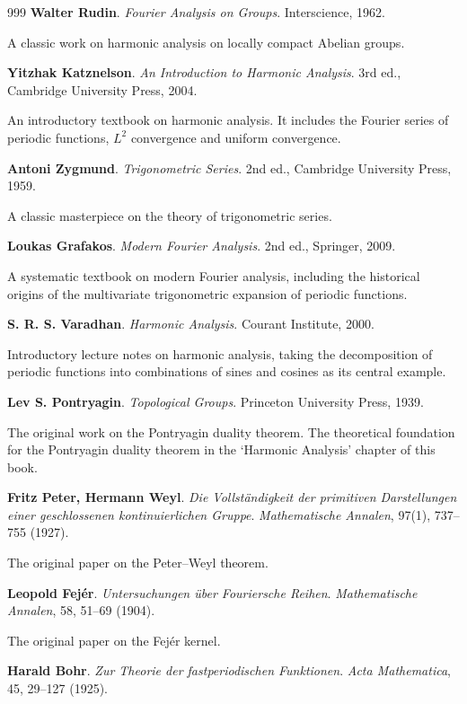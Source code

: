 \begin{thebibliography}{999}
 \textbf{Walter Rudin}. \textit{Fourier Analysis on Groups}. Interscience, 1962.

A classic work on harmonic analysis on locally compact Abelian groups.

 \textbf{Yitzhak Katznelson}. \textit{An Introduction to Harmonic Analysis}. 3rd ed., Cambridge University Press, 2004.

An introductory textbook on harmonic analysis. It includes the Fourier series of periodic functions, $L^2$ convergence and uniform convergence.

 \textbf{Antoni Zygmund}. \textit{Trigonometric Series}. 2nd ed., Cambridge University Press, 1959.

A classic masterpiece on the theory of trigonometric series.

 \textbf{Loukas Grafakos}. \textit{Modern Fourier Analysis}. 2nd ed., Springer, 2009.

A systematic textbook on modern Fourier analysis, including the historical origins of the multivariate trigonometric expansion of periodic functions.

 \textbf{S. R. S. Varadhan}. \textit{Harmonic Analysis}. Courant Institute, 2000.

Introductory lecture notes on harmonic analysis, taking the decomposition of periodic functions into combinations of sines and cosines as its central example.

 \textbf{Lev S. Pontryagin}. \textit{Topological Groups}. Princeton University Press, 1939.

The original work on the Pontryagin duality theorem. The theoretical foundation for the Pontryagin duality theorem in the `Harmonic Analysis' chapter of this book.

 \textbf{Fritz Peter, Hermann Weyl}. \textit{Die Vollst\"andigkeit der primitiven Darstellungen einer geschlossenen kontinuierlichen Gruppe}. \textit{Mathematische Annalen}, 97(1), 737--755 (1927).

The original paper on the Peter--Weyl theorem.

 \textbf{Leopold Fej\'er}. \textit{Untersuchungen \"uber Fouriersche Reihen}. \textit{Mathematische Annalen}, 58, 51--69 (1904).

The original paper on the Fej\'er kernel.

 \textbf{Harald Bohr}. \textit{Zur Theorie der fastperiodischen Funktionen}. \textit{Acta Mathematica}, 45, 29--127 (1925).


\end{thebibliography}
